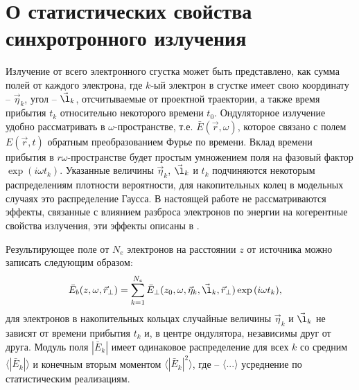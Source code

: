\section{О статистических свойства синхротронного излучения}
Излучение от всего электронного сгустка может быть представлено, как сумма полей от каждого электрона, где $k$-ый электрон в сгустке имеет свою координату -- $\vec{\eta}_k$, угол -- $\vec{\l}_k$, отсчитываемые от проектной траектории, а также время прибытия $t_k$ относительно некоторого времени $t_0$. Ондуляторное излучение удобно рассматривать в $\omega$-пространстве, т.е. $\bar{E}(\vec{r}, \omega)$, которое связано с полем $E(\vec{r}, t)$ обратным преобразованием Фурье по времени. Вклад времени прибытия в $r\omega$-пространстве будет простым умножением поля на фазовый фактор $\exp{(i \omega t_k)}$. Указанные величины $\vec{\eta}_k$, $\vec{\l}_k$ и $t_k$ подчиняются некоторым распределениям плотности вероятности, для накопительных колец в модельных случаях это распределение Гаусса. В настоящей работе не рассматриваются эффекты, связанные с влиянием разброса электронов по энергии на когерентные свойства излучения, эти эффекты описаны в \cite{geloni_effects_2018}. 

Результирующее поле от $N_e$ электронов на расстоянии $z$ от источника можно записать следующим образом:
\begin{align}
	\bar{E}_{b} (z, \omega, \vec{r}_{\bot}) = \sum\limits_{k=1}^{N_e} \bar{E}_{\bot}(&z_0, \omega, \vec{\eta}_k, \vec{\l}_k, \vec{r}_{\bot}) \exp{(i \omega t_k)},
	\label{eq:E_bunch} 
\end{align}
для электронов в накопительных кольцах случайные величины $\vec{\eta}_k$ и $\vec{\l}_k$ не зависят от времени прибытия $t_k$ и, в центре ондулятора, независимы друг от друга. Модуль поля $|\bar{E}_k|$ имеет одинаковое распределение для всех $k$ со средним $\big \langle|\bar{E}_k|\big \rangle$ и конечным вторым моментом  $\big \langle|\bar{E}_k|^2\big \rangle$, где -- $\langle . . . \rangle$ усреднение по статистическим реализациям.

